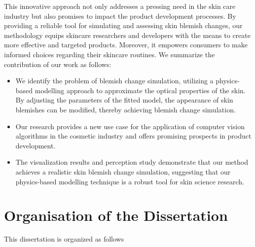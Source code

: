 \begin{spacing}{1.5}
This innovative approach not only addresses a pressing need in the skin care industry but also promises to impact the product development processes. By providing a reliable tool for simulating and assessing skin blemish changes, our methodology equips skincare researchers and developers with the means to create more effective and targeted products. Moreover, it empowers consumers to make informed choices regarding their skincare routines. We summarize the contribution of our work as follows:
\begin{itemize}
    \item We identify the problem of blemish change simulation, utilizing a physics-based modelling approach to approximate the optical properties of the skin. By adjusting the parameters of the fitted model, the appearance of skin blemishes can be modified, thereby achieving blemish change simulation.
    \item Our research provides a new use case for the application of computer vision algorithms in the cosmetic industry and offers promising prospects in product development.
    \item The visualization results and perception study demonstrate that our method achieves a realistic skin blemish change simulation, suggesting that our physics-based modelling technique is a robust tool for skin science research.
\end{itemize}

\section{Organisation of the Dissertation}

This dissertation is organized as follows

\end{spacing}
\newpage



